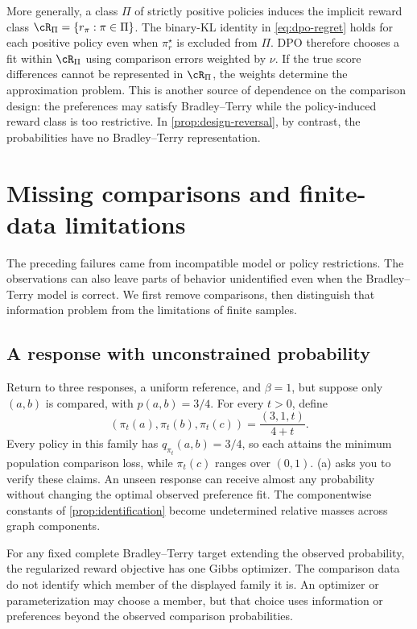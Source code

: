 \documentclass[11pt,twoside]{article}
\theoremstyle{definition}
\theoremstyle{remark}
\begin{document}
More generally, a class $\Pi$ of strictly positive policies induces the
implicit reward class
$\cR_\Pi=\{r_\pi:\pi\in\Pi\}$. The binary-KL identity in
\cref{eq:dpo-regret} holds for each positive policy even when $\pi_r^\star$
is excluded from $\Pi$. DPO therefore chooses a fit within $\cR_\Pi$ using
comparison errors weighted by $\nu$. If the true score differences cannot
be represented in $\cR_\Pi$, the weights determine the approximation problem.
This is another source of dependence on the comparison design: the
preferences may satisfy Bradley--Terry while the policy-induced reward
class is too restrictive. In \cref{prop:design-reversal}, by contrast,
the probabilities have no Bradley--Terry representation.

\section{Missing comparisons and finite-data limitations}
\label{sec:coverage}

The preceding failures came from incompatible model or policy restrictions.
The observations can also leave parts of behavior unidentified even when
the Bradley--Terry model is correct. We first remove comparisons, then distinguish
that information problem from the limitations of finite samples.

\subsection{A response with unconstrained probability}

Return to three responses, a uniform reference, and $\beta=1$, but suppose
only $(a,b)$ is compared, with $p(a,b)=3/4$. For every $t>0$, define
\begin{equation}
 (\pi_t(a),\pi_t(b),\pi_t(c))=\frac{(3,1,t)}{4+t}.
 \label{eq:unidentified-policy}
\end{equation}
Every policy in this family has $q_{\pi_t}(a,b)=3/4$, so each attains the
minimum population comparison loss, while $\pi_t(c)$ ranges over $(0,1)$.
(a) asks you to verify these claims.
An unseen response can receive
almost any probability without changing the optimal observed preference
fit. The componentwise constants of \cref{prop:identification} become
undetermined relative masses across graph components.

For any fixed complete Bradley--Terry target extending the observed
probability, the regularized reward objective has one Gibbs optimizer.
The comparison data do not identify which member of the displayed family
it is. An optimizer or parameterization may choose a member, but that choice
uses information or preferences beyond the observed comparison probabilities.
\end{document}

